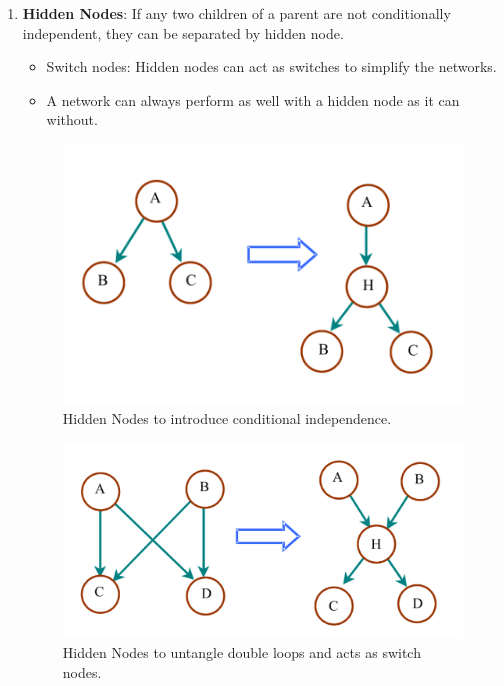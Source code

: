 \documentclass[12pt,twoside]{article}
\begin{document}
\begin{enumerate}
	\item \textbf{Hidden Nodes}: If any two children of a parent are not conditionally independent, they can be separated by hidden node.
		\begin{itemize}
			\item Switch nodes: Hidden nodes can act as switches to simplify the networks.
			\item A network can always perform as well with a hidden node as it can without.
		\end{itemize}
			
\begin{figure}[H]		
	\begin{center}
		\includegraphics[width = 0.4\hsize]{./figures/HiddenNodes.png} %
			\caption{Hidden Nodes to introduce conditional independence.}
		\label{fig:NaiveBayes} %
\end{center}
\end{figure}			

\begin{figure}[H]		
	\begin{center}
		\includegraphics[width = 0.4\hsize]{./figures/SwitchNodes.png} %
			\caption{Hidden Nodes to untangle double loops and acts as switch nodes.}
		\label{fig:NaiveBayes} %
\end{center}
\end{figure}	
\end{enumerate}
\end{document}
